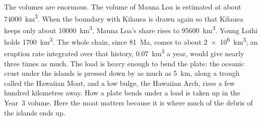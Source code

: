 The volumes are enormous. The volume of Mauna Loa is estimated at about \qty{74000}{km^3}. When the boundary with Kilauea is drawn again so that Kilauea keeps only about
\qty{10000}{km^3}, Mauna Loa's share rises to \qty{95600}{km^3}. Young Loihi holds
\qty{1700}{km^3}. The whole chain, since \qty{81}{Ma}, comes to about
\qty{2e6}{km^3}; an eruption rate integrated over that history, \qty{0.07}{km^3} a year, would give nearly three times as much. The load is heavy enough to bend the
plate: the oceanic crust under the islands is pressed down by as much as \qty{5}{km}, along a
trough called the Hawaiian Moat, and a low bulge, the Hawaiian Arch, rises a few hundred
kilometres away. How a plate bends under a load is taken up in the Year~3 volume. Here the moat
matters because it is where much of the debris of the islands ends up.

